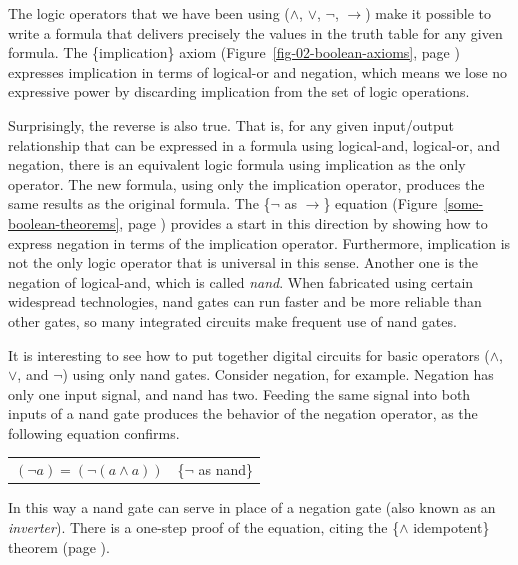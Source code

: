 The logic operators that we have been using
($\wedge$, $\vee$, $\neg$, $\rightarrow$)
make it possible to write a formula
that delivers precisely the values in the truth table
for any given formula.
The \{implication\} axiom
(Figure~\ref{fig-02-boolean-axioms}, page \pageref{fig-02-boolean-axioms})
expresses implication in terms of logical-or
and negation, which means we lose no expressive power by
discarding implication from the set of logic operations.

Surprisingly, the reverse is also true.
That is, for any given input/output relationship that can be expressed
in a formula using logical-and, logical-or, and negation,
there is an equivalent logic formula using implication as
the only operator. The new formula, using only the
implication operator, produces the same results
as the original formula.
The \{$\neg$ as $\rightarrow$\} equation
(Figure~\ref{some-boolean-theorems}, page \pageref{some-boolean-theorems})
provides a start in this direction by showing how to express
negation in terms of the implication operator.
Furthermore, implication is not the only logic operator
that is universal in this sense.
Another one
is the negation of logical-and, which is called
\emph{nand}.
When fabricated using certain widespread technologies,
nand gates can run faster and be more reliable than other gates,
so many integrated circuits make frequent use of nand gates.

It is interesting to see how to put together digital
circuits for basic operators
($\wedge$, $\vee$, and $\neg$) using only nand gates.
Consider negation, for example.
Negation has only one input signal, and nand has two.
Feeding the same signal into both
inputs of a nand gate produces the behavior of
the negation operator,
as the following equation confirms.

\begin{center}
\begin{tabular}{ll}
$(\neg a) = (\neg (a \wedge a))$  & \{$\neg$ as nand\}\label{neg-as-nand}
\end{tabular}
\end{center}

In this way a nand gate can serve in place of a
negation gate (also known as an \emph{inverter}).
There is a one-step proof of the equation,
citing the \{$\wedge$ idempotent\} theorem
(page \pageref{and-idempotent}).


